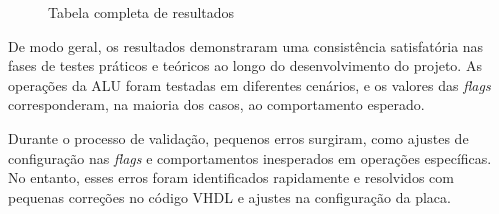 \begin{figure}[H]
\begin{tcolorbox}[left=5mm,right=5mm,top=0mm,bottom=5mm,boxsep=0mm,
toptitle=0.5mm,bottomtitle=0.5mm,title=Resultados Teóricos \textit{versus} Resultados Experimentais,center title]
\begin{minipage}{\textwidth}
{\begin{tabular}{c|c|c|c|c|c|c|c|c|c|c|c|c|c|c|c|c|c|c|c|c|c|c|c|c|c|c|c|}
\hline
\end{tabular}}
\end{minipage}%
\end{tcolorbox}
    \caption{Tabela completa de resultados}
    \label{tabela}
\end{figure}


De modo geral, os resultados demonstraram uma consistência satisfatória nas fases de testes práticos e teóricos ao longo do desenvolvimento do projeto. As operações da ALU foram testadas em diferentes cenários, e os valores das \textit{flags} corresponderam, na maioria dos casos, ao comportamento esperado.

\vspace{5mm}

Durante o processo de validação, pequenos erros surgiram, como ajustes de configuração nas \textit{flags} e comportamentos inesperados em operações específicas. No entanto, esses erros foram identificados rapidamente e resolvidos com pequenas correções no código VHDL e ajustes na configuração da placa.
\newpage